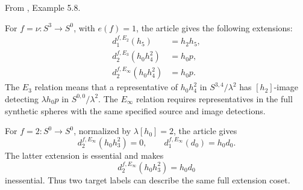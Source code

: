 \begin{proposition}
\label{paper:5.8}
\label{exam:extonEn}
From \cite{LWX126}, Example 5.8.\par
For $f=\nu:S^3\to S^0$, with $e(f)=1$, the article gives the following extensions:
\[
\begin{aligned}
d_1^{f,E_2}(h_5)&=h_2h_5,\\
d_2^{f,E_3}(h_0h_4^2)&=h_0p,\\
d_2^{f,E_\infty}(h_0h_4^2)&=h_0p.
\end{aligned}
\]
The $E_3$ relation means that a representative of $h_0h_4^2$ in $S^{3,4}/\lambda^2$ has $[h_2]$-image detecting $\lambda h_0p$ in $S^{0,0}/\lambda^2$. The $E_\infty$ relation requires representatives in the full synthetic spheres with the same specified source and image detections.

For $f=2:S^0\to S^0$, normalized by $\lambda[h_0]=2$, the article gives
\[
d_2^{f,E_\infty}(h_0h_3^2)=0,
\qquad d_1^{f,E_\infty}(d_0)=h_0d_0.
\]
The latter extension is essential and makes
\[
d_2^{f,E_\infty}(h_0h_3^2)=h_0d_0
\]
inessential. Thus two target labels can describe the same full extension coset.
\end{proposition}

